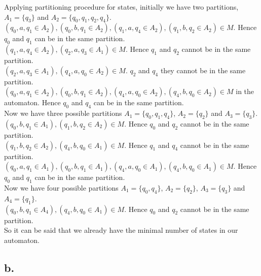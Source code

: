 \documentclass[12pt]{article}
\begin{document}
Applying partitioning procedure for states, initially we have two partitions, $A_1=\{q_3\}$ and $A_2=\{q_0, q_1, q_2, q_4\}$. \\
$(q_0, a, q_1\in A_2),(q_0, b, q_1\in A_2),(q_1, a, q_4\in A_2),(q_1, b, q_2\in A_2)\in M$. Hence $q_0$ and $q_1$ can be in the same partition. \\
$(q_1, a, q_4\in A_2), (q_2, a, q_3\in A_1)\in M$. Hence $q_1$ and $q_2$ cannot be in the same partition. \\
$(q_2, a, q_3\in A_1), (q_4, a, q_0\in A_2)\in M$. $q_2$ and $q_4$ they cannot be in the same partition. \\
$(q_0, a, q_1\in A_2),(q_0, b, q_1\in A_2),(q_4, a, q_0\in A_2),(q_4, b, q_0\in A_2)\in M$ in the automaton. Hence $q_0$ and $q_4$ can be in the same partition. \\

Now we have three possible partitions $A_1=\{q_0, q_1, q_4\}$, $A_2=\{q_2\}$ and $A_3=\{q_3\}$.\\
$(q_0, b, q_1\in A_1), (q_1, b, q_2\in A_2)\in M$. Hence $q_0$ and $q_2$ cannot be in the same partition. \\
$(q_1, b, q_2\in A_2), (q_4, b, q_0\in A_1)\in M$. Hence $q_1$ and $q_4$ cannot be in the same partition. \\
$(q_0, a, q_1\in A_1),(q_0, b, q_1\in A_1),(q_4, a, q_0\in A_1),(q_4, b, q_0\in A_1) \in M$. Hence $q_0$ and $q_1$ can be in the same partition. \\

Now we have four possible partitions $A_1=\{q_0, q_4\}$, $A_2=\{q_2\}$, $A_3=\{q_3\}$ and $A_4=\{q_1\}$.\\
$(q_0, b, q_1\in A_4), (q_4, b, q_0\in A_1)\in M$. Hence $q_0$ and $q_2$ cannot be in the same partition. \\

So it can be said that we already have the minimal number of states in our automaton.

\subsection*{b.}
\end{document}
